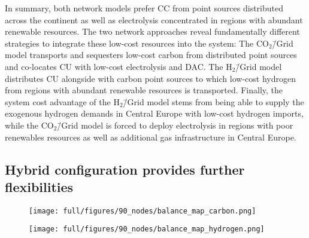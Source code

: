 \documentclass[twocolumn]{article}
\newcommand{\COtwo}{CO$_2$}
\newcommand{\Htwo}{H$_2$}
\newcommand{\modCO}{CO$_2$\=/Grid model}
\newcommand{\modH}{H$_2$\=/Grid model}
\newcommand{\carbon}{CO$_2$}
\newcommand{\hydrogen}{H$_2$}
\newcommand{\carbonmodel}{CO$_2$\=/Grid model}
\newcommand{\hydrogenmodel}{H$_2$\=/Grid model}
\newcommand{\hybridmodel}{Hybrid model}
\begin{document}
In summary, both network models prefer CC from point sources distributed across the continent as well as electrolysis concentrated in regions with abundant renewable resources. The two network approaches reveal fundamentally different strategies to integrate these low-cost resources into the system: The \carbonmodel{} transports and sequesters low-cost carbon from distributed point sources and co-locates CU with low-cost electrolysis and DAC. The \hydrogenmodel{} distributes CU alongside with carbon point sources to which low-cost hydrogen from regions with abundant renewable resources is transported.
%
Finally, the system cost advantage of the \modH{} stems from being able to supply the exogenous hydrogen demands in Central Europe with low-cost hydrogen imports, while the \modCO{} is forced to deploy electrolysis in regions with poor renewables resources as well as additional gas infrastructure in Central Europe.


\subsection*{Hybrid configuration provides further flexibilities}\label{subsec:Hybrid}


\begin{figure*}[ht!]
    \centering
    \begin{subfigure}{.5\textwidth}
        \centering
        \texttt{[image: full/figures/90\_nodes/balance\_map\_carbon.png]}
        \label{fig:capacity_map_carbon_co2}
    \end{subfigure}%
    \begin{subfigure}{.5\textwidth}
        \centering
        \texttt{[image: full/figures/90\_nodes/balance\_map\_hydrogen.png]}
        \label{fig:capacity_map_hydrogen_co2}
    \end{subfigure}
    \caption{Optimal operation, flows and prices of the carbon (left) and hydrogen (right) sectors for the \hybridmodel{} in the net zero scenario. For each region, upper semicircles show the average production per technology, lower semicircles the consumption, and colors the average marginal prices. Carbon Sequestration offshore are drawn as full circles. Lines and arrows show the interregional transportation. \carbon{} from point-source in the inland either supplies local CU with imported \hydrogen{} or facilitates sequestration in nearby offshore regions.
    }
    \label{fig:capacity_maps}
\end{figure*}
\end{document}
